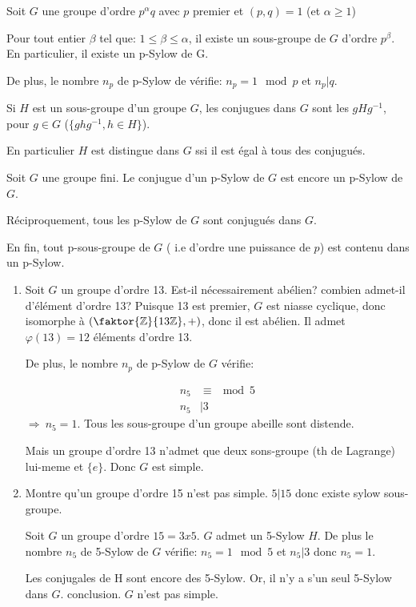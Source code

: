 \begin{theorem} Soit $G$ une groupe d'ordre $p^\alpha q$ avec $p$ premier et $(p, q)= 1$ (et $\alpha \geq 1$)

Pour tout entier $\beta$ tel que: $1\leq \beta \leq \alpha$, il existe un sous-groupe de $G$ d'ordre $p^\beta$. En particulier, il existe un p-Sylow de G.

De plus, le nombre $n_p$ de p-Sylow de vérifie:
$n_p = 1 \mod p$ et $n_p | q$.

\end{theorem}

\begin{definition}
	Si $H$ est un sous-groupe d'un groupe $G$, les conjugues dans $G$ sont les $gHg^{-1}$, pour $g\in G$ ($\{ghg^{-1}, h\in H\}$).
\end{definition}

En particulier $H$ est distingue dans $G$ ssi il est égal à tous des conjugués.

\begin{theorem}
Soit $G$ une groupe fini.
Le conjugue d'un p-Sylow de $G$ est encore un p-Sylow de $G$.

Réciproquement, tous les p-Sylow de $G$ sont conjugués dans $G$.

En fin, tout p-sous-groupe de $G$ ( i.e d'ordre une puissance de $p$) est contenu dans un p-Sylow.
\end{theorem}

\begin{exercise}
\begin{enumerate}
	\item Soit $G$ un groupe d'ordre 13. Est-il nécessairement abélien? combien admet-il d'élément d'ordre 13?
	Puisque 13 est premier, $G$ est niasse cyclique, donc isomorphe à $(\faktor{\mathbb{Z}}{13\mathbb{Z}},+)$, donc il est abélien. Il admet $\varphi(13)=12$ éléments d'ordre 13.
	
	De plus, le nombre $n_p$ de p-Sylow de $G$ vérifie:
	
	\begin{align*}
		n_5  &\equiv  \mod 5\\ n_5 &| 3
	\end{align*}
	$\Rightarrow\ n_5 = 1$.
	Tous les sous-groupe d'un groupe abeille sont distende.
	
	Mais un groupe d'ordre 13 n'admet que deux sons-groupe (th de Lagrange) lui-meme et $\{e\}$. Donc $G$ est simple.
	\item Montre qu'un groupe d'ordre 15 n'est pas simple. $5|15$ donc existe sylow sous-groupe. 
	
	Soit $G$ un groupe d'ordre $15=3x5$. $G$ admet un 5-Sylow $H$. De plus le nombre $n_5$ de 5-Sylow de $G$ vérifie: $n_5=1 \mod 5$ et $n_5 | 3$ donc $n_5=1$.
	
	Les conjugales de H sont encore des 5-Sylow. Or, il n'y a s'un seul 5-Sylow dans $G$. conclusion. $G$ n'est pas simple.
\end{enumerate}
\end{exercise}


